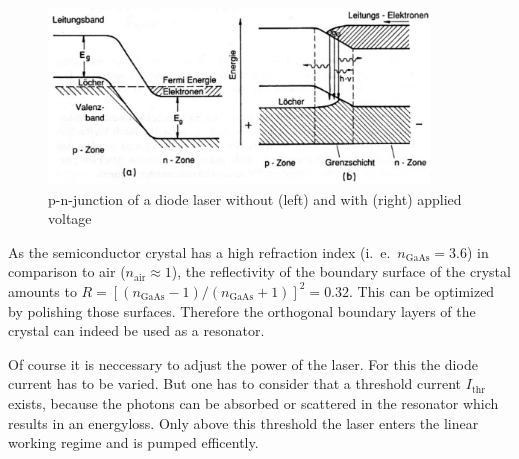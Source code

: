 \documentclass{protokoll_en}
\begin{document}
\begin{figure}[H]
	\centering
		\includegraphics[width=0.9\textwidth]{graphics/pn}
	\caption{p-n-junction of a diode laser without (left) and with (right) applied voltage~\cite{demtroed}}
	\label{fig:pn}
\end{figure}
As the semiconductor crystal has a high refraction index (i.\ e.\ $n_{\mathrm{GaAs}} = 3.6$) in comparison to air ($n_{\mathrm{air}} \approx 1$), the reflectivity of the boundary surface of the crystal amounts to $R=[(n_{\mathrm{GaAs}}-1)/(n_{\mathrm{GaAs}}+1)]^2 = 0.32$. This can be optimized by polishing those surfaces. Therefore the orthogonal boundary layers of the crystal can indeed be used as a resonator.

Of course it is neccessary to adjust the power of the laser. For this the diode current has to be varied. But one has to consider that a threshold current $I_{\mathrm{thr}}$ exists, because the photons can be absorbed or scattered in the resonator which results in an energyloss. Only above this threshold the laser enters the linear working regime and is pumped efficently.
\end{document}
